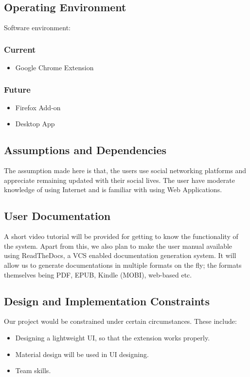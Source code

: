 \documentclass[12pt]{article}
\begin{document}
\subsection{Operating Environment}
Software environment:

    \subsubsection{Current}
    \begin{itemize}
    
    \item Google Chrome Extension
    \end{itemize}
    \subsubsection{Future}
    \begin{itemize}
        \item Firefox Add-on
    \item Desktop App
    \end{itemize}
    


\subsection{Assumptions and Dependencies}
The assumption made here is that, the users use social networking platforms and appreciate remaining updated with their social lives. The user have moderate knowledge of using Internet and
is familiar with using Web Applications.

\subsection{User Documentation}
A short video tutorial will be provided for getting to know the functionality of the system. Apart from this, we also plan to make the user manual available using ReadTheDocs, a VCS enabled documentation generation system. It will allow us to generate documentations in multiple formats on the fly; the formats themselves being PDF, EPUB, Kindle (MOBI), web-based etc.

\subsection{Design and Implementation Constraints}
Our project would be constrained under certain circumstances. These
include:
\begin{itemize}

    \item Designing a lightweight UI, so that the extension works properly.


    \item Material design will be used in UI designing.
    \item Team skills.
    \end{itemize}
\end{document}
